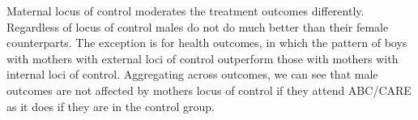 Maternal locus of control moderates the treatment outcomes differently. Regardless of locus of control males do not do much better than their female counterparts. The exception is for health outcomes, in which the pattern of boys with mothers with external loci of control outperform those with mothers with internal loci of control. Aggregating across outcomes, we can see that male outcomes are not affected by mothers locus of control if they attend ABC/CARE as it does if they are in the control group.



